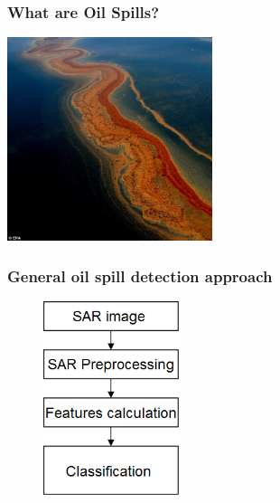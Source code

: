 \documentclass{beamer}
\begin{document}
\begin{frame}
\frametitle{What are Oil Spills?}

	\centering
	\includegraphics[width=60mm,scale=1]{./img/mex.jpg}	
    
\end{frame}


\begin{frame}
\frametitle{General oil spill detection approach}

	\begin{figure}
		\centering
    	\includegraphics[width=40mm,scale=1]{./img/basicsteps.png}
	\end{figure}

\end{frame}

\end{document}
